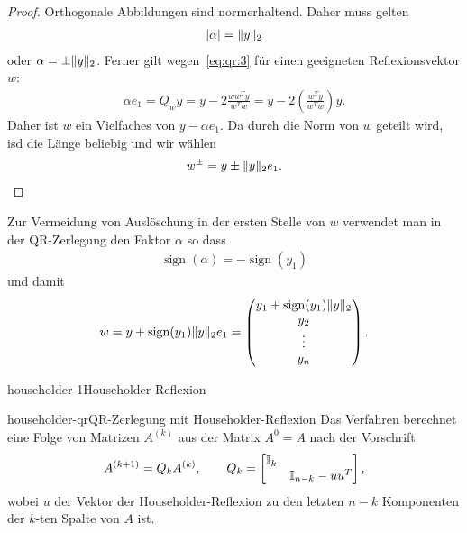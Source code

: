 \begin{proof}
  Orthogonale Abbildungen sind normerhaltend. Daher muss gelten
  \begin{gather}
    \lvert\alpha\rvert = \lVert y\rVert_2
  \end{gather}
  oder $\alpha = \pm\lVert y\rVert_2$.  Ferner gilt
  wegen~\eqref{eq:qr:3} für einen geeigneten Reflexionsvektor $w$:
  \begin{gather}
    \alpha e_1 = Q_{w} y = y-2 \frac{ww^Ty}{w^Tw}
    = y-2\left(\frac{w^Ty}{w^Tw}\right)y.
  \end{gather}
  Daher ist $w$ ein Vielfaches von $y - \alpha e_1$. Da durch die Norm
  von $w$ geteilt wird, isd die Länge beliebig und wir wählen
  \begin{gather}
    w^{\pm} = y\pm \lVert y\rVert_2 e_1.
  \end{gather}
\end{proof}

\begin{remark}
  Zur Vermeidung von Auslöschung in der ersten Stelle von $w$
  verwendet man in der QR-Zerlegung den Faktor $\alpha$ so dass
  \begin{gather}
    \operatorname{sign} (\alpha) = -\operatorname{sign} (y_1)
  \end{gather}
  und damit
  \begin{gather}
    w = y + \operatorname{sign} (y_1) \lVert y\rVert_2 e_1
    =
    \begin{pmatrix}
      y_1 + \operatorname{sign} (y_1) \lVert y\rVert_2\\
      y_2\\\vdots\\y_n
    \end{pmatrix}.
  \end{gather}
\end{remark}

\begin{Algorithmus*}{householder-1}{Householder-Reflexion}
  
\end{Algorithmus*}

\begin{Definition*}{householder-qr}{QR-Zerlegung mit Householder-Reflexion}
  Das Verfahren berechnet eine Folge von Matrizen $A^{(k)}$ aus der
  Matrix $A^{0} = A$ nach der Vorschrift
  \begin{gather}
    A^{(k+1)} = Q_{k} A^{(k)}, \qquad Q_k =
    \begin{bmatrix}
      \mathbb I_k\\& \mathbb I_{n-k}-uu^T
    \end{bmatrix},
  \end{gather}
  wobei $u$ der Vektor der Householder-Reflexion zu den letzten $n-k$
  Komponenten der $k$-ten Spalte von $A$ ist.
\end{Definition*}

